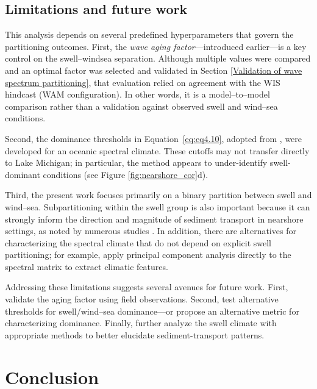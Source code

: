 \subsection{Limitations and future work}
\label{c4_Limitation}

This analysis depends on several predefined hyperparameters that govern the
partitioning outcomes. First, the \emph{wave aging factor}—introduced earlier—is
a key control on the swell–windsea separation. Although multiple values were
compared and an optimal factor was selected and validated in Section
\ref{Validation of wave spectrum partitioning}, that evaluation relied on
agreement with the WIS hindcast (WAM configuration). In other words, it is a
model–to–model comparison rather than a validation against observed swell and
wind–sea conditions.

Second, the dominance thresholds in Equation~\ref{eq:eq4.10}, adopted from
\citet{mazzaretto2024worldwide}, were developed for an oceanic spectral climate.
These cutoffs may not transfer directly to Lake Michigan; in particular, the
method appears to under-identify swell-dominant conditions (see Figure
\ref{fig:nearshore_cor}d).

Third, the present work focuses primarily on a binary partition between swell
and wind–sea. Subpartitioning within the swell group is also important because
it can strongly inform the direction and magnitude of sediment transport in
nearshore settings, as noted by numerous studies
\citep[\eg][]{mazzaretto2024worldwide,coates_beach_1998,langodan_unraveling_2018,portilla-yandun_climate_2016,sartini_spectral_2024,venolia_historical_2024,zheng_investigation_2024}.
In addition, there are alternatives for characterizing the spectral climate that
do not depend on explicit swell partitioning; for example,
\citet{echevarria_influence_2020,echevarria_seasonal_2019} apply principal
component analysis directly to the spectral matrix to extract climatic features.

Addressing these limitations suggests several avenues for future work. First,
validate the aging factor using field observations. Second, test alternative
thresholds for swell/wind–sea dominance—or propose an alternative metric for
characterizing dominance. Finally, further analyze the swell climate with
appropriate methods to better elucidate sediment-transport patterns.

\section{Conclusion}
\label{c4_Conclusion}

